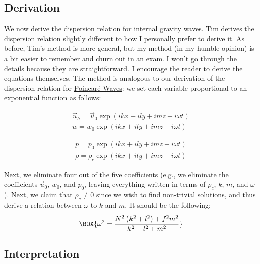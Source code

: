 \subsection{Derivation}

We now derive the dispersion relation for internal gravity waves. Tim derives the dispersion relation slightly different to how I personally prefer to derive it. As before, Tim's method is more general, but my method (in my humble opinion) is a bit easier to remember and churn out in an exam. I won't go through the details because they are straightforward. I encourage the reader to derive the equations themselves. The method is analogous to our derivation of the dispersion relation for \hyperref[2D Poincare]{Poincaré Waves}: we set each variable proportional to an exponential function as follows:

\begin{minipage}{0.48\linewidth}
    \begin{align*}
        \vec{u}_h = \vec{u}_0 \exp \left( ikx + ily + imz - i\omega t \right)
        \\
        w = w_0 \exp \left( ikx + ily + imz - i\omega t \right)
    \end{align*}
\end{minipage}
\hfill
\begin{minipage}{0.48\linewidth}
    \begin{align*}
        p = p_0 \exp \left( ikx + ily + imz - i\omega t \right)
        \\
        \rho = \rho_c \exp \left( ikx + ily + imz - i\omega t \right)
    \end{align*}
\end{minipage}

\vspace{2mm} Next, we eliminate four out of the five coefficients (e.g., we eliminate the coefficients $\vec{u}_0$, $w_0$, and $p_0$, leaving everything written in terms of $\rho_c$, $k$, $m$, and $\omega$). Next, we claim that $\rho_c\neq 0$ since we wish to find non-trivial solutions, and thus derive a relation between $\omega$ to $k$ and $m$. It should be the following:
\begin{gather}
    \BOX{\omega^2 = \frac{N^2 \left( k^2 + l^2 \right) + f^2 m^2}{k^2 + l^2 + m^2}}
\end{gather}

\subsection{Interpretation}

